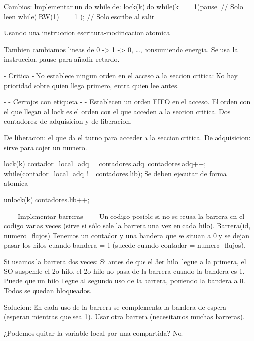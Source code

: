 Cambios:
Implementar un do while de:
lock(k){
    do{
        while(k == 1){pause;}    // Solo leen
    }while( RW(1) == 1 );   // Solo escribe al salir
}

Usando una instruccion escritura-modificacion atomica

Tambien cambiamos lineas de 0 -> 1 -> 0, \ldots, consumiendo energia.
Se usa la instruccion pause para añadir retardo.

- Critica -
No establece ningun orden en el acceso a la seccion critica: No hay prioridad sobre quien llega primero, entra quien lee antes.

- - Cerrojos con etiqueta - -
Establecen un orden FIFO en el acceso.
El orden con el que llegan al lock es el orden con el que acceden a la seccion critica.
Dos contadores: de adquisicion y de liberacion.

De liberacion: el que da el turno para acceder a la seccion critica. De adquisicion: sirve para cojer un numero.

lock(k){
    contador_local_adq = contadores.adq;
    contadores.adq++;
    while(contador_local_adq != contadores.lib){;}
}
Se deben ejecutar de forma atomica

unlock(k){
    contadores.lib++;
}


- - - Implementar barreras - - -
Un codigo posible si no se reusa la barrera en el codigo varias veces (sirve si sólo sale la barrera una vez en cada hilo).
Barrera(id, numero_flujos)
Tenemos un contador y una bandera que se situan a 0 y se dejan pasar los hilos cuando bandera = 1 (sucede cuando contador = numero_flujos).

Si usamos la barrera dos veces:
Si antes de que el 3er hilo llegue a la primera, el SO suspende el 2o hilo. el 2o hilo no pasa de la barrera cuando la bandera es 1. Puede que un hilo llegue al segundo uso de la barrera, poniendo la bandera a 0. Todos se quedan bloqueados.

Solucion:
En cada uso de la barrera se complementa la bandera de espera (esperan mientras que sea 1).
Usar otra barrera (necesitamos muchas barreras).

¿Podemos quitar la variable local por una compartida?
No.



